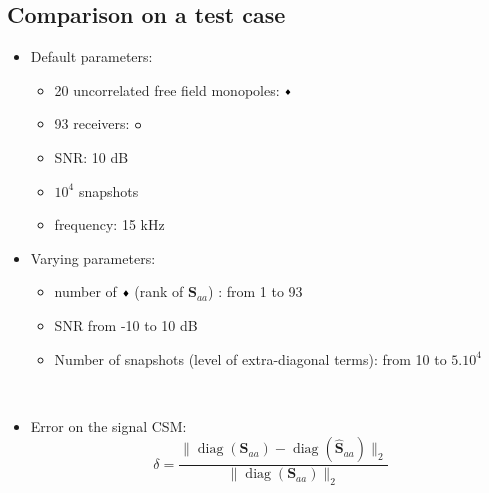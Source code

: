 \documentclass[8pt,xcolor=x11names,compress, notes=show]{beamer}%
\newcommand{\diag}[1]{\operatorname{diag}\left(#1\right)}
\begin{document}
\subsection{Comparison on a test case}
\begin{frame}{\insertsectionhead}
	
	\begin{itemize}
	\item Default parameters:
		\noindent\begin{minipage}{\linewidth}
		     	\begin{minipage}{0.4\linewidth}		     		
	         			\begin{itemize}
					\item 20  uncorrelated free field monopoles: \textcolor{red}{$\vcenter{\hbox{\tiny$\blacklozenge$}}$}
					\item 93 receivers: \textcolor{colorAlice}{$\vcenter{\hbox{\small$\bm{\circ}$}}$}
					\item SNR: 10 dB
					\item $10^4$ snapshots
					\item frequency: 15 kHz
				\end{itemize}	
	               		\vfill
	     		\end{minipage}
	      		\hfill
	     		 \begin{minipage}{0.5\linewidth}
             			\centering
             			\vspace{-0.5cm}
				
	      		\end{minipage}
		\end{minipage}
	
	\item Varying parameters: \\
	\begin{itemize}
	        \item number of   \textcolor{red}{$\vcenter{\hbox{\tiny$\blacklozenge$}}$} (rank of $\bm{S}_{aa}$) : from 1 to 93\\[3pt]
	        \item SNR from -10 to 10 dB\\[3pt]
	        \item Number of snapshots (level of extra-diagonal terms): from 10 to $5.10^4$
\end{itemize}~\\	
	
	\item Error on the signal CSM:
	\begin{equation*}
   		 \delta = \frac{\|\diag{\bm{S}_{aa}}  - \diag{\bm{\hat{S}}_{aa}}\|_2}{\|\diag{\bm{S}_{aa} } \|_2}
	\end{equation*}
	\end{itemize}

\end{frame}
\end{document}

